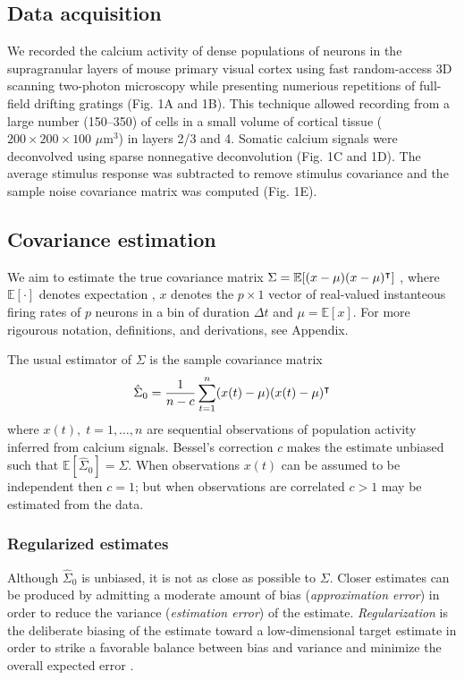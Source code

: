 \subsection*{Data acquisition}
We recorded the calcium activity  of dense populations of neurons in the supragranular layers of mouse primary visual cortex using fast random-access 3D scanning two-photon microscopy \cite{Stosiek:2003,Reddy:2005}   while presenting numerious repetitions of full-field drifting gratings (Fig. 1A and 1B). This technique allowed recording from a large number (150--350) of cells in a small volume of cortical tissue ($200\times200\times100$ $\mu$m$^3$) in layers 2/3 and 4. Somatic calcium signals were deconvolved using  sparse nonnegative deconvolution \cite{Vogelstein:2010} (Fig. 1C and 1D).  The average stimulus response was subtracted to remove stimulus covariance and the sample noise covariance matrix was computed (Fig. 1E).



\subsection*{Covariance estimation}
We aim to estimate the true covariance matrix $\Sigma = \mathbb E [(x-\mu)(x-\mu)^\intercal]$ , where $\mathbb E[\cdot]$ denotes expectation , $x$ denotes the $p\times 1$ vector of real-valued instanteous firing rates of $p$ neurons in a bin of duration $\Delta t$ and $\mu = \mathbb E[x]$.  For more rigourous notation, definitions, and derivations, see Appendix. 

The usual estimator of $\Sigma$ is the sample covariance matrix
\begin{equation}
\hat \Sigma_0 = \frac 1 {n-c} \sum\limits_{t=1}^n (x(t)-\mu)(x(t)-\mu)^\intercal 
\end{equation}
where $x(t),\;t=1,\ldots,n$ are sequential observations of population activity inferred from calcium signals. Bessel's correction $c$ makes the estimate unbiased such that $\mathbb E[\hat\Sigma_0] = \Sigma$. When observations $x(t)$ can be assumed to be independent then $c=1$; but when observations are correlated $c>1$ may be estimated from the data. 



\subsubsection*{Regularized estimates}
Although $\hat\Sigma_0$ is unbiased, it is not as close as possible to $\Sigma$.  Closer estimates can be produced by admitting a moderate amount of bias (\emph{approximation error}) in order to reduce the variance (\emph{estimation error}) of the estimate. 
\emph{Regularization} is the deliberate biasing of the estimate toward a low-dimensional target estimate in order to strike a favorable balance between bias and variance and minimize the overall expected error \cite{Bickel:2006,Ledoit:2004}.

